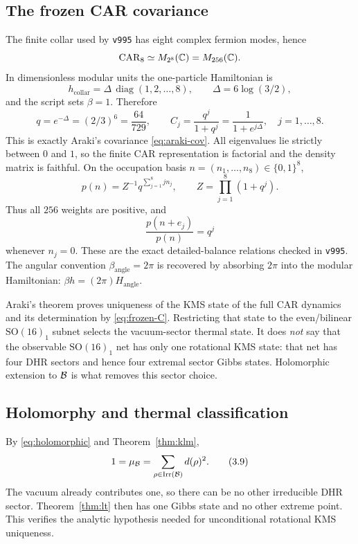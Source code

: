 \subsection{The frozen CAR covariance}

The finite collar used by \texttt{v995} has eight complex fermion
modes, hence
\[
 \operatorname{CAR}_8\simeq M_{2^8}(\mathbb C)=M_{256}(\mathbb C).
\]
In dimensionless modular units the one-particle Hamiltonian is
\[
 h_{\mathrm{collar}}
 =\Delta\,\operatorname{diag}(1,2,\ldots,8),
\qquad
 \Delta=6\log(3/2),
\tag{3.6}\label{eq:collar-h}
\]
and the script sets $\beta=1$.  Therefore
\[
 q=e^{-\Delta}=(2/3)^6=\frac{64}{729},
\qquad
 C_j=\frac{q^j}{1+q^j}
 =\frac1{1+e^{j\Delta}},\quad j=1,\ldots,8.
\tag{3.7}\label{eq:frozen-C}
\]
This is exactly Araki's covariance
\eqref{eq:araki-cov}.  All eigenvalues lie strictly between $0$ and
$1$, so the finite CAR representation is factorial and the density
matrix is faithful.  On the occupation basis
$n=(n_1,\ldots,n_8)\in\{0,1\}^8$,
\[
 p(n)=Z^{-1}q^{\sum_{j=1}^{8}jn_j},
\qquad
 Z=\prod_{j=1}^{8}(1+q^j).
\tag{3.8}\label{eq:gibbs-weights}
\]
Thus all $256$ weights are positive, and
\[
 \frac{p(n+e_j)}{p(n)}=q^j
\]
whenever $n_j=0$.  These are the exact detailed-balance relations
checked in \texttt{v995}.  The angular convention
$\beta_{\mathrm{angle}}=2\pi$ is recovered by absorbing $2\pi$ into
the modular Hamiltonian: $\beta h=(2\pi)H_{\mathrm{angle}}$.

\begin{remark}
Araki's theorem proves uniqueness of the KMS state of the full CAR
dynamics and its determination by \eqref{eq:frozen-C}.  Restricting
that state to the even/bilinear $\mathrm{SO}(16)_1$ subnet selects the
vacuum-sector thermal state.  It does \emph{not} say that the
observable $\mathrm{SO}(16)_1$ net has only one rotational KMS state:
that net has four DHR sectors and hence four extremal sector Gibbs
states.  Holomorphic extension to $\mathcal B$ is what removes this sector
choice.
\end{remark}

\subsection{Holomorphy and thermal classification}

By \eqref{eq:holomorphic} and Theorem~\ref{thm:klm},
\[
 1=\mu_{\mathcal B}
 =\sum_{\rho\in\operatorname{Irr}(\mathcal B)}d(\rho)^2.
\tag{3.9}\label{eq:one-sector}
\]
The vacuum already contributes one, so there can be no other
irreducible DHR sector.  Theorem~\ref{thm:lt} then has one Gibbs
state and no other extreme point.  This verifies the analytic
hypothesis needed for unconditional rotational KMS uniqueness.

